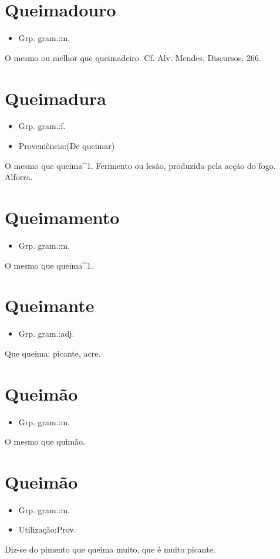 \section{Queimadouro}
\begin{itemize}
\item {Grp. gram.:m.}
\end{itemize}
O mesmo ou melhor que \textunderscore queimadeiro\textunderscore . Cf. Alv. Mendes, \textunderscore Discursos\textunderscore , 266.
\section{Queimadura}
\begin{itemize}
\item {Grp. gram.:f.}
\end{itemize}
\begin{itemize}
\item {Proveniência:(De \textunderscore queimar\textunderscore )}
\end{itemize}
O mesmo que \textunderscore queima\textunderscore ^1.
Ferimento ou lesão, produzida pela acção do fogo.
Alforra.
\section{Queimamento}
\begin{itemize}
\item {Grp. gram.:m.}
\end{itemize}
O mesmo que \textunderscore queima\textunderscore ^1.
\section{Queimante}
\begin{itemize}
\item {Grp. gram.:adj.}
\end{itemize}
Que queima; picante, acre.
\section{Queimão}
\begin{itemize}
\item {Grp. gram.:m.}
\end{itemize}
O mesmo que \textunderscore quimão\textunderscore .
\section{Queimão}
\begin{itemize}
\item {Grp. gram.:m.}
\end{itemize}
\begin{itemize}
\item {Utilização:Prov.}
\end{itemize}
Diz-se do pimento que queima muito, que é muito picante.

